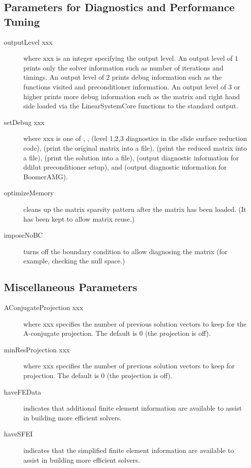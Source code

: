 \subsection{Parameters for Diagnostics and Performance Tuning}
\begin{description}
\item[outputLevel xxx] where xxx is an integer specifying the output
     level.  An output level of $1$ prints only the solver
     information such as number of iterations and timings.
     An output level of $2$ prints debug information such as
     the functions visited and preconditioner information.
     An output level of $3$ or higher prints more debug information
     such as the matrix and right hand side loaded via the
     {\sf LinearSystemCore} functions to the standard output.
\item[setDebug xxx] where xxx is one of ,
     ,  (level 1,2,3 
     diagnostics in the slide surface reduction code), 
      (print the original matrix into a file), 
      (print the reduced matrix
     into a file),   (print the solution into a file),
      (output diagnostic information for ddilut
     preconditioner setup), and  (output diagnostic
     information for BoomerAMG).
\item[optimizeMemory] cleans up the matrix sparsity pattern after the matrix
     has been loaded. (It has been kept to allow matrix reuse.)
\item[imposeNoBC] turns off the boundary condition to allow diagnosing the
     matrix (for example, checking the null space.)
\end{description}
                                                                                
\subsection{Miscellaneous Parameters}
\begin{description}
\item[AConjugateProjection xxx] where xxx specifies the number of previous
     solution vectors to keep for the A-conjugate projection.
     The default is 0 (the projection is off).
\item[minResProjection xxx] where xxx specifies the number of previous
     solution vectors to keep for projection.
     The default is 0 (the projection is off).
\item[haveFEData] indicates that additional finite element information are
     available to assist in building more efficient solvers.
\item[haveSFEI] indicates that the simplified finite element information are
     available to assist in building more efficient solvers.
\end{description}
                                                                                
